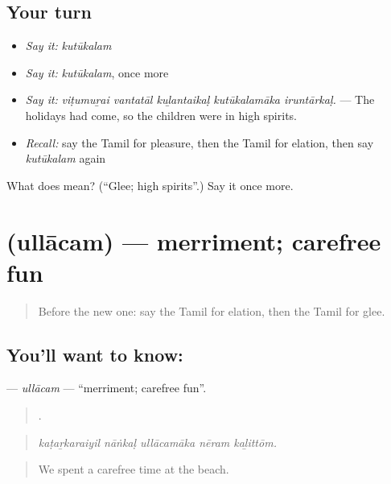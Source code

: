 \subsection*{Your turn}
\begin{itemize}
\raggedright
  \item \emph{Say it:} \emph{kutūkalam}
  \item \emph{Say it:} \emph{kutūkalam}, once more
  \item \emph{Say it:} \emph{viṭumuṟai vantatāl kuḻantaikaḷ kutūkalamāka iruntārkaḷ.} — The holidays had come, so the children were in high spirits.
  \item \emph{Recall:} say the Tamil for pleasure, then the Tamil for elation, then say \emph{kutūkalam} again
\end{itemize}

\begin{tcolorbox}[breakable,colback=teal!4,colframe=teal!35!black,title={Before you move on}]
What does  mean? (\textquotedblleft{}Glee; high spirits\textquotedblright{}.) Say it once more.
\end{tcolorbox}
\section[\texorpdfstring{\ta{உல்லாசம்} (ullācam)}{உல்லாசம் (ullācam)}]{ (ullācam) — merriment; carefree fun}

\label{lesson:TA-C459-ullacam}



\begin{quote}
Before the new one: say the Tamil for elation, then the Tamil for glee.
\end{quote}

\subsection*{You'll want to know: }
\textbf{} — \emph{ullācam} — \textquotedblleft{}merriment; carefree fun\textquotedblright{}.

\begin{quote}
    .
\end{quote}

\begin{quote}
\emph{kaṭaṟkaraiyil nāṅkaḷ ullācamāka nēram kaḻittōm.}
\end{quote}

\begin{quote}
We spent a carefree time at the beach.
\end{quote}


